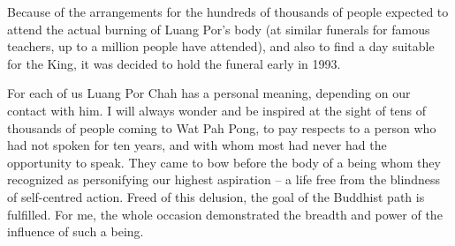 Because of the arrangements for the hundreds of thousands of people
expected to attend the actual burning of Luang Por's body (at similar
funerals for famous teachers, up to a million people have attended), and
also to find a day suitable for the King, it was decided to hold the
funeral early in 1993. 

For each of us Luang Por Chah has a personal meaning, depending on our
contact with him. I will always wonder and be inspired at the sight of
tens of thousands of people coming to Wat Pah Pong, to pay respects to a
person who had not spoken for ten years, and with whom most had never
had the opportunity to speak. They came to bow before the body of a
being whom they recognized as personifying our highest aspiration -- a
life free from the blindness of self-centred action. Freed of this
delusion, the goal of the Buddhist path is fulfilled. For me, the whole
occasion demonstrated the breadth and power of the influence of such a
being. 
